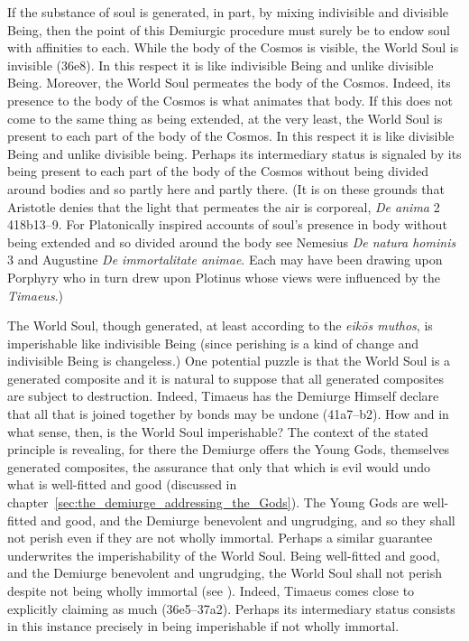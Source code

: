 If the substance of soul is generated, in part, by mixing indivisible and divisible Being, then the point of this Demiurgic procedure must surely be to endow soul with affinities to each. While the body of the Cosmos is visible, the World Soul is invisible (36e8). In this respect it is like indivisible Being and unlike divisible Being. Moreover, the World Soul permeates the body of the Cosmos. Indeed, its presence to the body of the Cosmos is what animates that body. If this does not come to the same thing as being extended, at the very least, the World Soul is present to each part of the body of the Cosmos. In this respect it is like divisible Being and unlike divisible being. Perhaps its intermediary status is signaled by its being present to each part of the body of the Cosmos without being divided around bodies and so partly here and partly there. (It is on these grounds that Aristotle denies that the light that permeates the air is corporeal, \emph{De anima} 2 418b13--9. For Platonically inspired accounts of soul's presence in body without being extended and so divided around the body see Nemesius \emph{De natura hominis} 3 and Augustine \emph{De immortalitate animae}. Each may have been drawing upon Porphyry who in turn drew upon Plotinus whose views were influenced by the \emph{Timaeus}.) 

The World Soul, though generated, at least according to the \emph{eikōs muthos}, is imperishable like indivisible Being (since perishing is a kind of change and indivisible Being is changeless.) One potential puzzle is that the World Soul is a generated composite and it is natural to suppose that all generated composites are subject to destruction. Indeed, Timaeus has the Demiurge Himself declare that all that is joined together by bonds may be undone (41a7--b2). How and in what sense, then, is the World Soul imperishable? The context of the stated principle is revealing, for there the Demiurge offers the Young Gods, themselves generated composites, the assurance that only that which is evil would undo what is well-fitted and good (discussed in chapter~\ref{sec:the_demiurge_addressing_the_Gods}). The Young Gods are well-fitted and good, and the Demiurge benevolent and ungrudging, and so they shall not perish even if they are not wholly immortal. Perhaps a similar guarantee underwrites the imperishability of the World Soul. Being well-fitted and good, and the Demiurge benevolent and ungrudging, the World Soul shall not perish despite not being wholly immortal (see \citealt{Betegh:2019fq}). Indeed, Timaeus comes close to explicitly claiming as much (36e5--37a2). Perhaps its intermediary status consists in this instance precisely in being imperishable if not wholly immortal. 

